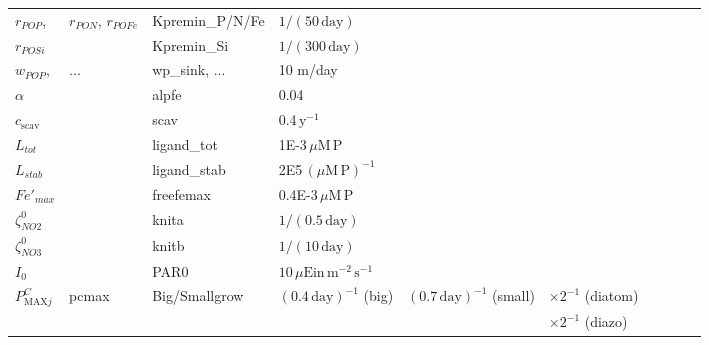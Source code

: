 \documentclass[letterpaper,10pt]{article}
\newcommand{\dy}{\mathrm{day}}
\newcommand{\yr}{\mathrm{y}}
\newcommand{\uM}{\mu\mathrm{M}}
\renewcommand{\P}{\mathrm{P}}
\newcommand{\uEin}{\mu\text{Ein}}
\newcommand{\m}{\mathrm{m}}
\newcommand{\s}{\mathrm{s}}
\newcommand{\pcmax}[1]{P^C_{\textrm{MAX}#1}}
\newcommand{\alphachl}{\alpha^{\textrm{Chl}}}
\begin{document}
\begin{tabular}{llllllllll}
  $r_{POP}$, & $r_{PON}$, $r_{POFe}$    & Kpremin\_P/N/Fe & $1/(50\,\dy)$ \\
  $r_{POSi}$          &  & Kpremin\_Si  & $1/(300\,\dy)$ \\
  $w_{POP}$, & ...       & wp\_sink, ... & 10 m/day \\
  \hline                
  $\alpha$            &  & alpfe        & 0.04 \\
  $c_{\text{scav}}$   &  & scav         & 0.4$\,\yr^{-1}$ \\
  $L_{tot}$           &  & ligand\_tot  & 1E-3$\,\uM\,\P$ \\
  $L_{stab}$          &  & ligand\_stab & 2E5$\,(\uM\,\P)^{-1}$ \\
  $Fe'_{max}$         &  & freefemax    & 0.4E-3$\,\uM\,\P$ \\
  \hline
  $\zeta_{NO2}^0$     &  & knita        & $1/(0.5\,\dy)$ \\
  $\zeta_{NO3}^0$     &  & knitb        & $1/(10\,\dy)$ \\
  $I_0$               &  & PAR0         & $10\,\uEin\,\m^{-2}\,\s^{-1}$ \\
  \hline
  \hline
%
%
%
%
  $\pcmax{j}$    & pcmax    & Big/Smallgrow  & $(0.4\,\dy)^{-1}$ (big)       & $(0.7\,\dy)^{-1}$ (small)        & $\times 2^{-1}$ (diatom) \\ %
                 &          &                &                               &                                  & $\times 2^{-1}$ (diazo) \\

\end{tabular}
\end{document}
